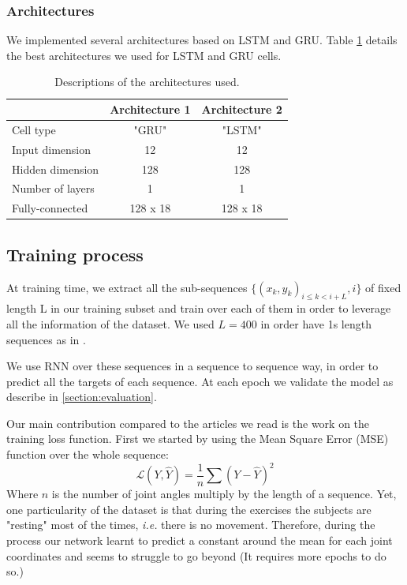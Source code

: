 \documentclass[final]{cvpr}
\begin{document}
\subsubsection*{Architectures}
We implemented several architectures based on LSTM and GRU. Table \ref{architectures} details the best architectures we used for LSTM and GRU cells.
\begin{table}
	\begin{center}
		\begin{tabular}{l c c }
			\toprule
			& Architecture 1 & Architecture 2 \\
			\hline
			Cell type & "GRU" & "LSTM"   \\
			Input dimension & 12 & 12 \\
			Hidden dimension & 128 & 128 \\
			Number of layers & 1& 1\\
			\hline
			Fully-connected  & 128 x 18& 128 x 18\\
			\toprule
		\end{tabular}
	\end{center}
	\caption{Descriptions of the architectures used.}
	\label{architectures}
\end{table}

\subsection{Training process}

At training time, we extract all the sub-sequences $\{(x_k, y_k)_{i \le k<i+L}, i\}$ of fixed length L in our training subset and train over each of them in order to leverage all the information of the dataset. We used $L=400$ in order have 1s length sequences as in \cite{Koch}.

We use RNN over these sequences in a sequence to sequence way, in order to predict all the targets of each sequence. At each epoch we validate the model as describe in \ref{section:evaluation}.

Our main contribution compared to the articles we read is the work on the training loss function. First we started by using the Mean Square Error (MSE) function over the whole sequence: 
$$\mathcal{L}(Y,\hat{Y})=\frac{1}{n}\sum (Y-\hat{Y})^2$$
Where $n$ is the number of joint angles multiply by the length of a sequence.
Yet, one particularity of the dataset is that during the exercises the subjects are "resting" most of the times, \textit{i.e.} there is no movement. Therefore, during the process our network learnt to predict a constant around the mean for each joint coordinates and seems to struggle to go beyond (It requires more epochs to do so.)
\end{document}
